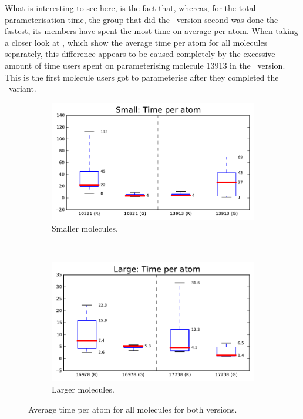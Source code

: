What is interesting to see here, is the fact that, whereas, for the total parameterisation time, the group that did the \IDb\ version second was done the fastest, its members have spent the most time on average per atom. When taking a closer look at , which show the average time per atom for all molecules separately, this difference appears to be caused completely by the excessive amount of time users spent on parameterising molecule 13913 in the \IDb\ version. This is the first molecule users got to parameterise after they completed the \IDa\ variant.

\begin{figure}[h!]
\centering
\begin{subfigure}[t]{0.48\textwidth}
\centering
\includegraphics[width=\textwidth]{img/graphs/1c_03.pdf}
\caption{Smaller molecules.}
\end{subfigure}%
~
\begin{subfigure}[t]{0.48\textwidth}
\centering
\includegraphics[width=\textwidth]{img/graphs/1d_03.pdf}
\caption{Larger molecules.}
\end{subfigure}
\caption{Average time per atom for all molecules for both versions.}
\end{figure}

